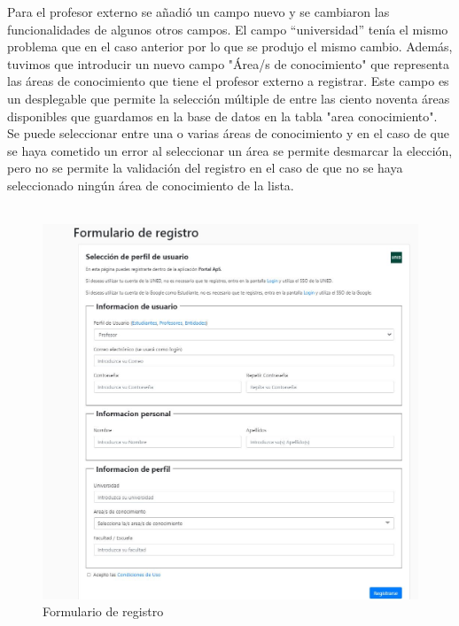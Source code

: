 \documentclass[11pt]{book}
\begin{document}
Para el profesor externo se añadió un campo nuevo y se cambiaron las funcionalidades de algunos otros campos. El campo “universidad” tenía el mismo problema que en el caso anterior por lo que se produjo el mismo cambio. Además, tuvimos que introducir un nuevo campo "Área/s de conocimiento" que representa las áreas de conocimiento que tiene el profesor externo a registrar. Este campo es un desplegable que permite la selección múltiple de entre las ciento noventa áreas disponibles que guardamos en la base de datos en la tabla "area conocimiento". Se puede seleccionar entre una o varias áreas de conocimiento y en el caso de que se haya cometido un error al seleccionar un área se permite desmarcar la elección, pero no se permite la validación del registro en el caso de que no se haya seleccionado ningún área de conocimiento de la lista.\\\\

\begin{figure}[t]
	\centering
	\includegraphics[scale=0.7]{registro}
	\caption{Formulario de registro}
\end{figure}
\end{document}
